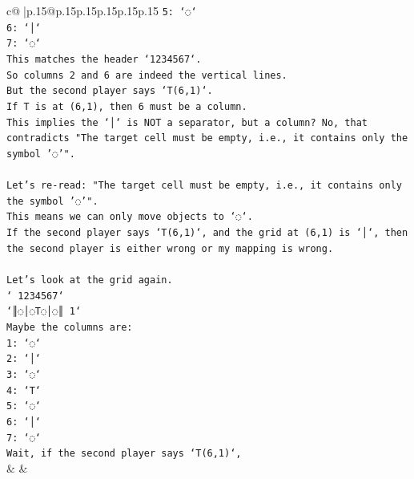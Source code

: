 \documentclass{article}
\begin{document}
{\begin{supertabular}{c@{$\;$}|p{.15\linewidth}@{}p{.15\linewidth}p{.15\linewidth}p{.15\linewidth}p{.15\linewidth}p{.15\linewidth}}
{{{\texttt{5: `◌`} \\
\texttt{6: `│`} \\
\texttt{7: `◌`} \\
\texttt{This matches the header `1234567`.} \\
\texttt{So columns 2 and 6 are indeed the vertical lines.} \\
\texttt{But the second player says `T(6,1)`.} \\
\texttt{If T is at (6,1), then 6 must be a column.} \\
\texttt{This implies the `│` is NOT a separator, but a column? No, that contradicts "The target cell must be empty, i.e., it contains only the symbol '◌'".} \\
\\ 
\texttt{Let's re{-}read: "The target cell must be empty, i.e., it contains only the symbol '◌'".} \\
\texttt{This means we can only move objects to `◌`.} \\
\texttt{If the second player says `T(6,1)`, and the grid at (6,1) is `│`, then the second player is either wrong or my mapping is wrong.} \\
\\ 
\texttt{Let's look at the grid again.} \\
\texttt{` 1234567`} \\
\texttt{`║◌│◌T◌│◌║ 1`} \\
\texttt{Maybe the columns are:} \\
\texttt{1: `◌`} \\
\texttt{2: `│`} \\
\texttt{3: `◌`} \\
\texttt{4: `T`} \\
\texttt{5: `◌`} \\
\texttt{6: `│`} \\
\texttt{7: `◌`} \\
\texttt{Wait, if the second player says `T(6,1)`,} \\
            }
        }
    }
    & & \\ \\


\end{supertabular}}
\end{document}

